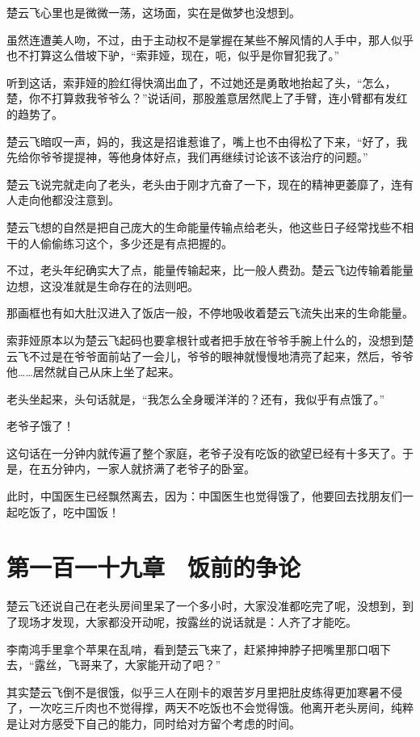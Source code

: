 楚云飞心里也是微微一荡，这场面，实在是做梦也没想到。

虽然连遭美人吻，不过，由于主动权不是掌握在某些不解风情的人手中，那人似乎也不打算这么借坡下驴，“索菲娅，现在，呃，似乎是你冒犯我了。”

听到这话，索菲娅的脸红得快滴出血了，不过她还是勇敢地抬起了头，“怎么，楚，你不打算救我爷爷么？”说话间，那股羞意居然爬上了手臂，连小臂都有发红的趋势了。

楚云飞暗叹一声，妈的，我这是招谁惹谁了，嘴上也不由得松了下来，“好了，我先给你爷爷提提神，等他身体好点，我们再继续讨论该不该治疗的问题。”

楚云飞说完就走向了老头，老头由于刚才亢奋了一下，现在的精神更萎靡了，连有人走向他都没注意到。

楚云飞想的自然是把自己庞大的生命能量传输点给老头，他这些日子经常找些不相干的人偷偷练习这个，多少还是有点把握的。

不过，老头年纪确实大了点，能量传输起来，比一般人费劲。楚云飞边传输着能量边想，这没准就是生命存在的法则吧。

那画框也有如大肚汉进入了饭店一般，不停地吸收着楚云飞流失出来的生命能量。

索菲娅原本以为楚云飞起码也要拿根针或者把手放在爷爷手腕上什么的，没想到楚云飞不过是在爷爷面前站了一会儿，爷爷的眼神就慢慢地清亮了起来，然后，爷爷他……居然就自己从床上坐了起来。

老头坐起来，头句话就是，“我怎么全身暖洋洋的？还有，我似乎有点饿了。”

老爷子饿了！

这句话在一分钟内就传遍了整个家庭，老爷子没有吃饭的欲望已经有十多天了。于是，在五分钟内，一家人就挤满了老爷子的卧室。

此时，中国医生已经飘然离去，因为：中国医生也觉得饿了，他要回去找朋友们一起吃饭了，吃中国饭！

\section{第一百一十九章　饭前的争论}

楚云飞还说自己在老头房间里呆了一个多小时，大家没准都吃完了呢，没想到，到了现场才发现，大家都没开动呢，按露丝的说话就是：人齐了才能吃。

李南鸿手里拿个苹果在乱啃，看到楚云飞来了，赶紧抻抻脖子把嘴里那口咽下去，“露丝，飞哥来了，大家能开动了吧？”

其实楚云飞倒不是很饿，似乎三人在刚卡的艰苦岁月里把肚皮练得更加寒暑不侵了，一次吃三斤肉也不觉得撑，两天不吃饭也不会觉得饿。他离开老头房间，纯粹是让对方感受下自己的能力，同时给对方留个考虑的时间。

